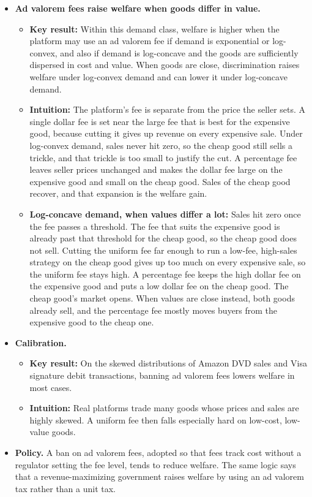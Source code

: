 \documentclass[11pt]{article}
\begin{document}
\begin{itemize}
    \item \textbf{Ad valorem fees raise welfare when goods differ in value.}
    \begin{itemize}
        \item \textbf{Key result:} Within this demand class, welfare is higher
        when the platform may use an ad valorem fee if demand is exponential
        or log-convex, and also if demand is log-concave and the goods are
        sufficiently dispersed in cost and value.  When goods are close,
        discrimination raises welfare under log-convex demand and can lower it
        under log-concave demand.
        \item \textbf{Intuition:} The platform's fee is separate from the
        price the seller sets.  A single dollar fee is set near the large fee
        that is best for the expensive good, because cutting it gives up
        revenue on every expensive sale.  Under log-convex demand, sales never
        hit zero, so the cheap good still sells a trickle, and that trickle is
        too small to justify the cut.  A percentage fee leaves seller prices
        unchanged and makes the dollar fee large on the expensive good and
        small on the cheap good.  Sales of the cheap good recover, and that
        expansion is the welfare gain.
        \item \textbf{Log-concave demand, when values differ a lot:}
        Sales hit zero once the fee passes a threshold.  The fee that suits
        the expensive good is already past that threshold for the cheap good,
        so the cheap good does not sell.  Cutting the uniform fee far enough
        to run a low-fee, high-sales strategy on the cheap good gives up too
        much on every expensive sale, so the uniform fee stays high.  A
        percentage fee keeps the high dollar fee on the expensive good and
        puts a low dollar fee on the cheap good.  The cheap good's market
        opens.  When values are close instead, both goods already sell, and
        the percentage fee mostly moves buyers from the expensive good to the
        cheap one.
    \end{itemize}

    \item \textbf{Calibration.}
    \begin{itemize}
        \item \textbf{Key result:} On the skewed distributions of Amazon DVD
        sales and Visa signature debit transactions, banning ad valorem fees
        lowers welfare in most cases.
        \item \textbf{Intuition:} Real platforms trade many goods whose prices
        and sales are highly skewed.  A uniform fee then falls especially
        hard on low-cost, low-value goods.
    \end{itemize}

    \item \textbf{Policy.}
    A ban on ad valorem fees, adopted so that fees track cost without a
    regulator setting the fee level, tends to reduce welfare.  The same logic
    says that a revenue-maximizing government raises welfare by using an ad
    valorem tax rather than a unit tax.
\end{itemize}
\end{document}
